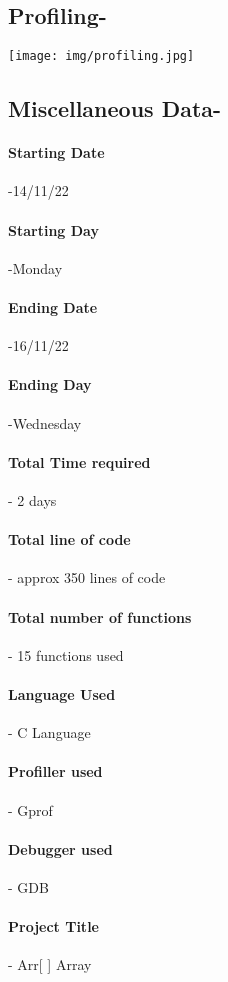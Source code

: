 \documentclass[12pt,a4paper]{article}
\begin{document}
\pagebreak

\subsection{Profiling-}


\texttt{[image: img/profiling.jpg]}

\pagebreak


\subsection{Miscellaneous Data-}

\paragraph{Starting Date}-14/11/22
\\
\paragraph{Starting Day}-Monday
\\
\paragraph{Ending Date}-16/11/22
\\
\paragraph{Ending Day}-Wednesday
\\
\paragraph{Total Time required}- 2 days
\\
\paragraph{Total line of code}- approx 350 lines of code
\\
\paragraph{Total number of functions}- 15  functions used
\\
\paragraph{Language Used}- C Language
\\
\paragraph{Profiller used}- Gprof
\\
\paragraph{Debugger used}- GDB
\\
\paragraph{Project Title}- Arr[  ] Array
\\


\pagebreak
\end{document}
